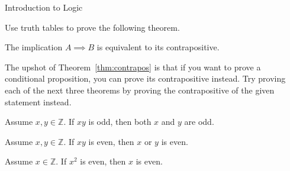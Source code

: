 \begin{section}{Introduction to Logic}

Use truth tables to prove the following theorem.

\begin{theorem}\label{thm:contrapos}
The implication ${A\implies B}$ is equivalent to its contrapositive.
\end{theorem}

The upshot of Theorem~\ref{thm:contrapos} is that if you want to prove a conditional proposition, you can prove its contrapositive instead.  Try proving each of the next three theorems by proving the contrapositive of the given statement instead.

\begin{theorem}
Assume $x,y\in\mathbb{Z}$.  If $xy$ is odd, then both $x$ and $y$ are odd.
\end{theorem}

\begin{theorem}
Assume $x,y\in\mathbb{Z}$.  If $xy$ is even, then $x$ or $y$ is even.
\end{theorem}

\begin{theorem}
Assume $x\in\mathbb{Z}$. If $x^2$ is even, then $x$ is even.
\end{theorem}

\end{section}